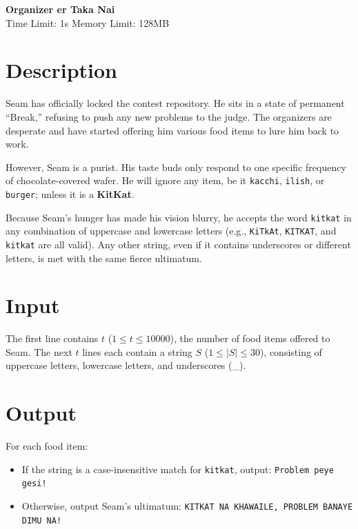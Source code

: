 \documentclass[11pt, a4paper]{article}
\begin{document}
\begin{center}
    {\Huge \textbf{Organizer er Taka Nai}} \\
    \vspace{0.2cm}
    Time Limit: 1s \quad Memory Limit: 128MB
\end{center}

\section*{Description}
Seam has officially locked the contest repository. He sits in a state of permanent ``Break,'' refusing to push any new problems to the judge. The organizers are desperate and have started offering him various food items to lure him back to work.

However, Seam is a purist. His taste buds only respond to one specific frequency of chocolate-covered wafer. He will ignore any item, be it \texttt{kacchi}, \texttt{ilish}, or \texttt{burger}; unless it is a \textbf{KitKat}. 

Because Seam's hunger has made his vision blurry, he accepts the word \texttt{kitkat} in any combination of uppercase and lowercase letters (e.g., \texttt{KiTkAt}, \texttt{KITKAT}, and \texttt{kitkat} are all valid). Any other string, even if it contains underscores or different letters, is met with the same fierce ultimatum.

\section*{Input}
The first line contains $t$ ($1 \le t \le 10000$), the number of food items offered to Seam.
The next $t$ lines each contain a string $S$ ($1 \le |S| \le 30$), consisting of uppercase letters, lowercase letters, and underscores (\_).

\section*{Output}
For each food item:
\begin{itemize}
    \item If the string is a case-insensitive match for \texttt{kitkat}, output: \texttt{Problem peye gesi!}
    \item Otherwise, output Seam's ultimatum: \texttt{KITKAT NA KHAWAILE, PROBLEM BANAYE DIMU NA!}
\end{itemize}
\end{document}

